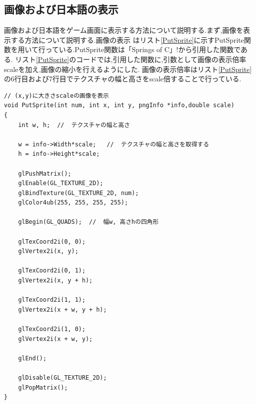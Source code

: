 \documentclass[a4j]{jarticle}
\begin{document}
  \subsection{画像および日本語の表示}  
  画像および日本語をゲーム画面に表示する方法について説明する.まず,画像を表示する方法について説明する.画像の表示
  はリスト\ref{PutSprite}に示すPutSprite関数を用いて行っている.PutSprite関数は「Springs of C」!から引用した関数である.
  リスト\ref{PutSprite}のコードでは,引用した関数に,引数として画像の表示倍率scaleを加え,画像の縮小を行えるようにした.
  画像の表示倍率はリスト\ref{PutSprite}の6行目および7行目でテクスチャの幅と高さをscale倍することで行っている.
  \begin{lstlisting}[basicstyle=\ttfamily\footnotesize, frame=single,label=PutSprite,caption=PutSprite関数]
// (x,y)に大きさscaleの画像を表示
void PutSprite(int num, int x, int y, pngInfo *info,double scale)
{
    int w, h;  //  テクスチャの幅と高さ

    w = info->Width*scale;   //  テクスチャの幅と高さを取得する
    h = info->Height*scale;

    glPushMatrix();
    glEnable(GL_TEXTURE_2D);
    glBindTexture(GL_TEXTURE_2D, num);
    glColor4ub(255, 255, 255, 255);

    glBegin(GL_QUADS);  //  幅w, 高さhの四角形

    glTexCoord2i(0, 0); 
    glVertex2i(x, y);

    glTexCoord2i(0, 1);
    glVertex2i(x, y + h);

    glTexCoord2i(1, 1);
    glVertex2i(x + w, y + h);

    glTexCoord2i(1, 0);
    glVertex2i(x + w, y);

    glEnd();

    glDisable(GL_TEXTURE_2D);
    glPopMatrix();
}
          \end{lstlisting} 
\end{document}
